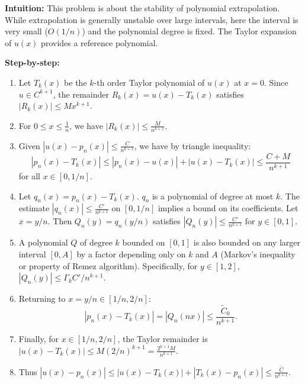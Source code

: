 \begin{solution}
\textbf{Intuition:} This problem is about the stability of polynomial extrapolation. While extrapolation is generally unstable over large intervals, here the interval is very small ($O(1/n)$) and the polynomial degree is fixed. The Taylor expansion of $u(x)$ provides a reference polynomial.

\textbf{Step-by-step:}
\begin{enumerate}
    \item Let $T_k(x)$ be the $k$-th order Taylor polynomial of $u(x)$ at $x=0$. Since $u \in C^{k+1}$, the remainder $R_k(x) = u(x) - T_k(x)$ satisfies $|R_k(x)| \leq M x^{k+1}$.
    \item For $0 \leq x \leq \frac{1}{n}$, we have $|R_k(x)| \leq \frac{M}{n^{k+1}}$.
    \item Given $|u(x) - p_n(x)| \leq \frac{C}{n^{k+1}}$, we have by triangle inequality:
    \[ |p_n(x) - T_k(x)| \leq |p_n(x) - u(x)| + |u(x) - T_k(x)| \leq \frac{C+M}{n^{k+1}} \]
    for all $x \in [0, 1/n]$.
    \item Let $q_n(x) = p_n(x) - T_k(x)$. $q_n$ is a polynomial of degree at most $k$.
    The estimate $|q_n(x)| \leq \frac{C'}{n^{k+1}}$ on $[0, 1/n]$ implies a bound on its coefficients.
    Let $x = y/n$. Then $Q_n(y) = q_n(y/n)$ satisfies $|Q_n(y)| \leq \frac{C'}{n^{k+1}}$ for $y \in [0, 1]$.
    \item A polynomial $Q$ of degree $k$ bounded on $[0, 1]$ is also bounded on any larger interval $[0, A]$ by a factor depending only on $k$ and $A$ (Markov's inequality or property of Remez algorithm).
    Specifically, for $y \in [1, 2]$, $|Q_n(y)| \leq \Gamma_k C'/n^{k+1}$.
    \item Returning to $x = y/n \in [1/n, 2/n]$:
    \[ |p_n(x) - T_k(x)| = |Q_n(nx)| \leq \frac{\tilde{C}_0}{n^{k+1}}. \]
    \item Finally, for $x \in [1/n, 2/n]$, the Taylor remainder is $|u(x) - T_k(x)| \leq M (2/n)^{k+1} = \frac{2^{k+1}M}{n^{k+1}}$.
    \item Thus $|u(x) - p_n(x)| \leq |u(x) - T_k(x)| + |T_k(x) - p_n(x)| \leq \frac{\tilde{C}}{n^{k+1}}$.
\end{enumerate}
\end{solution}

